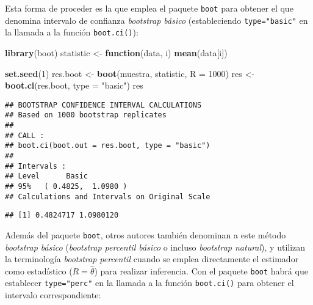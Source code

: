 \documentclass[]{book}
\newenvironment{Shaded}{\begin{snugshade}}{\end{snugshade}}
\newcommand{\KeywordTok}[1]{\textcolor[rgb]{0.13,0.29,0.53}{\textbf{#1}}}
\newcommand{\DataTypeTok}[1]{\textcolor[rgb]{0.13,0.29,0.53}{#1}}
\newcommand{\DecValTok}[1]{\textcolor[rgb]{0.00,0.00,0.81}{#1}}
\newcommand{\StringTok}[1]{\textcolor[rgb]{0.31,0.60,0.02}{#1}}
\newcommand{\ControlFlowTok}[1]{\textcolor[rgb]{0.13,0.29,0.53}{\textbf{#1}}}
\newcommand{\OperatorTok}[1]{\textcolor[rgb]{0.81,0.36,0.00}{\textbf{#1}}}
\newcommand{\NormalTok}[1]{#1}
\theoremstyle{break}
\theoremstyle{definition}
\theoremstyle{definition}
\theoremstyle{definition}
\theoremstyle{remark}
\begin{document}
Esta forma de proceder es la que emplea el paquete \texttt{boot} para
obtener el que denomina intervalo de confianza \emph{bootstrap básico}
(estableciendo \texttt{type="basic"} en la llamada a la función
\texttt{boot.ci()}):

\begin{Shaded}
\begin{Highlighting}[]
\KeywordTok{library}\NormalTok{(boot)}
\NormalTok{statistic <-}\StringTok{ }\ControlFlowTok{function}\NormalTok{(data, i) }\KeywordTok{mean}\NormalTok{(data[i])}

\KeywordTok{set.seed}\NormalTok{(}\DecValTok{1}\NormalTok{)}
\NormalTok{res.boot <-}\StringTok{ }\KeywordTok{boot}\NormalTok{(muestra, statistic, }\DataTypeTok{R =} \DecValTok{1000}\NormalTok{)}
\NormalTok{res <-}\StringTok{ }\KeywordTok{boot.ci}\NormalTok{(res.boot, }\DataTypeTok{type =} \StringTok{"basic"}\NormalTok{)}
\NormalTok{res}
\end{Highlighting}
\end{Shaded}

\begin{verbatim}
## BOOTSTRAP CONFIDENCE INTERVAL CALCULATIONS
## Based on 1000 bootstrap replicates
## 
## CALL : 
## boot.ci(boot.out = res.boot, type = "basic")
## 
## Intervals : 
## Level      Basic         
## 95%   ( 0.4825,  1.0980 )  
## Calculations and Intervals on Original Scale
\end{verbatim}

\begin{Shaded}
\end{Shaded}

\begin{verbatim}
## [1] 0.4824717 1.0980120
\end{verbatim}

Además del paquete \texttt{boot}, otros autores también denominan a este
método \emph{bootstrap básico} (\emph{bootstrap percentil básico} o
incluso \emph{bootstrap natural}), y utilizan la terminología
\emph{bootstrap percentil} cuando se emplea directamente el estimador
como estadístico (\(R = \hat \theta\)) para realizar inferencia. Con el
paquete \texttt{boot} habrá que establecer \texttt{type="perc"} en la
llamada a la función \texttt{boot.ci()} para obtener el intervalo
correspondiente:
\end{document}
